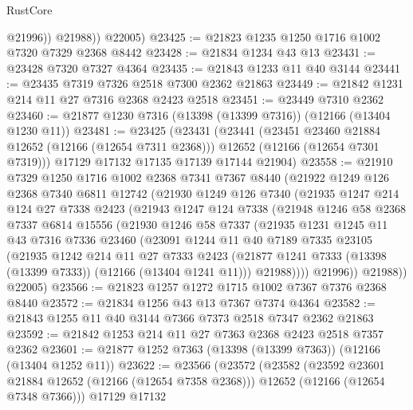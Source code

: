 \begin{lexlean}{RustCore}
\begin{coremodule}
              @21996))
          @21988))
      @22005)
@23425 := @21823 @1235 @1250 @1716 @1002 @7320 @7329 @2368 @8442
@23428 := @21834 @1234 @43 @13
@23431 := @23428 @7320 @7327 @4364
@23435 := @21843 @1233 @11 @40 @3144
@23441 := @23435 @7319 @7326 @2518 @7300 @2362 @21863
@23449 := @21842 @1231 @214 @11 @27 @7316 @2368 @2423 @2518
@23451 := @23449 @7310 @2362
@23460 := @21877 @1230 @7316 (@13398 (@13399 @7316)) (@12166 (@13404 @1230 @11))
@23481 := @23425
    (@23431
      (@23441
        (@23451 @23460 @21884 @12652 (@12166 (@12654 @7311 @2368)))
        @12652
        (@12166 (@12654 @7301 @7319)))
      @17129
      @17132
      @17135
      @17139
      @17144
      @21904)
@23558 := @21910
    @7329
    @1250
    @1716
    @1002
    @2368
    @7341
    @7367
    @8440
    (@21922
      @1249
      @126
      @2368
      @7340
      @6811
      @12742
      (@21930
        @1249
        @126
        @7340
        (@21935
          @1247
          @214
          @124
          @27
          @7338
          @2423
          (@21943
            @1247
            @124
            @7338
            (@21948
              @1246
              @58
              @2368
              @7337
              @6814
              @15556
              (@21930
                @1246
                @58
                @7337
                (@21935
                  @1231
                  @1245
                  @11
                  @43
                  @7316
                  @7336
                  @23460
                  (@23091
                    @1244
                    @11
                    @40
                    @7189
                    @7335
                    @23105
                    (@21935
                      @1242
                      @214
                      @11
                      @27
                      @7333
                      @2423
                      (@21877 @1241 @7333 (@13398 (@13399 @7333)) (@12166 (@13404 @1241 @11)))
                      @21988))))
              @21996))
          @21988))
      @22005)
@23566 := @21823 @1257 @1272 @1715 @1002 @7367 @7376 @2368 @8440
@23572 := @21834 @1256 @43 @13 @7367 @7374 @4364
@23582 := @21843 @1255 @11 @40 @3144 @7366 @7373 @2518 @7347 @2362 @21863
@23592 := @21842 @1253 @214 @11 @27 @7363 @2368 @2423 @2518 @7357 @2362
@23601 := @21877 @1252 @7363 (@13398 (@13399 @7363)) (@12166 (@13404 @1252 @11))
@23622 := @23566
    (@23572
      (@23582
        (@23592 @23601 @21884 @12652 (@12166 (@12654 @7358 @2368)))
        @12652
        (@12166 (@12654 @7348 @7366)))
      @17129
      @17132

\end{coremodule}
\end{lexlean}
